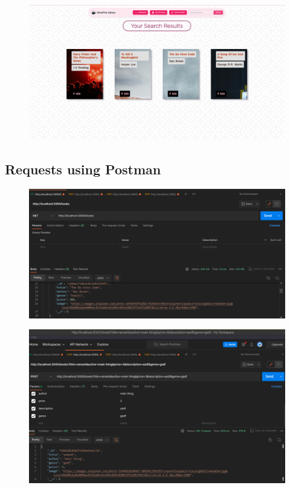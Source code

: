\documentclass[11pt]{article}
\begin{document}
\begin{figure}[H]
    \centering
    \includegraphics[width=.95\textwidth]{screenshots/search.png}
    \caption{ }
\end{figure}

\subsection{Requests using Postman}

\begin{figure}[H]
    \centering
    \includegraphics[width=.95\textwidth]{screenshots/postman 1.png}
    \caption{}
\end{figure}

\begin{figure}[H]
    \centering
    \includegraphics[width=.95\textwidth]{screenshots/postman 2.png}
    \caption{}
\end{figure}
\end{document}
